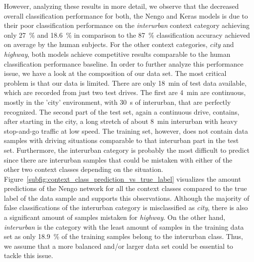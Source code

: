 However, analyzing these results in more detail, we observe that the decreased overall classification performance for both, the \ac{Nengo} and Keras models is due to their poor classification performance on the \emph{interurban} context category achieving only \SI{27}{\percent} and \SI{18.6}{\percent} in comparison to the \SI{87}{\percent} classification accuracy achieved on average by the human subjects.
For the other context categories, \emph{city} and \emph{highway}, both models achieve competitive results comparable to the human classification performance baseline.
In order to further analyze this performance issue, we have a look at the composition of our data set.
The most critical problem is that our data is limited.
There are only \SI{18}{\minute} of test data available, which are recorded from just two test drives.
The first are \SI{4}{\minute} are continuous, mostly in the 'city' environment, with \SI{30}{\second} of interurban, that are perfectly recognized.
The second part of the test set, again a continuous drive, contains, after starting in the city, a long stretch of about \SI{8}{\minute} interurban with heavy stop-and-go traffic at low speed.
The training set, however, does not contain data samples with driving situations comparable to that interurban part in the test set.
Furthermore, the interurban category is probably the most difficult to predict since there are interurban samples that could be mistaken with either of the other two context classes depending on the situation.
Figure~\ref{subfig:context_class_prediction_vs_true_label} visualizes the amount predictions of the \ac{Nengo} network for all the context classes compared to the true label of the data sample and supports this observations.
Although the majority of false classifications of the interurban category is misclassified as \emph{city}, there is also a significant amount of samples mistaken for \emph{highway}.
On the other hand, \emph{interurban} is the category with the least amount of samples in the training data set as only \SI{18.9}{\percent} of the training samples belong to the interurban class.
Thus, we assume that a more balanced and/or larger data set could be essential to tackle this issue.

